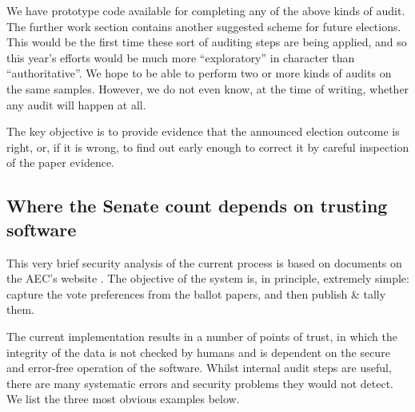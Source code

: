 \documentclass[10pt,a4paper]{article}
\newcommand{\longVersion}[1]{#1}
\newcommand{\longVersion}[1]{}
\begin{document}
We have prototype code available for completing any of the above kinds of audit.  
\longVersion{The further work section contains another suggested scheme for future elections.}
This would be the first time these sort of auditing steps are being applied, and so this year's efforts would be much more ``exploratory'' in character than ``authoritative''.  We hope to be able to perform two or more kinds of audits on the same samples.  However, we do not even know, at the time of writing, whether any audit will happen at all.  

The key objective is to provide evidence that the announced election outcome is right, or, if it is wrong, to find out early enough to correct it by careful inspection of the paper evidence.

\subsection{Where the Senate count depends on trusting software}
This very brief security analysis of the current process is based on documents on the AEC's website  \cite{AECSenateDesign}.
The objective of the system is, in principle, extremely simple:
capture the vote preferences from the ballot papers, and then publish
\& tally them. 

The current implementation results in a number of points of trust, in which the integrity of the data is not checked by humans and is dependent on the secure and error-free operation of the software. Whilst internal audit steps are useful, there are many systematic errors and security problems they would not detect.  We list the three most obvious examples below. 
\end{document}
